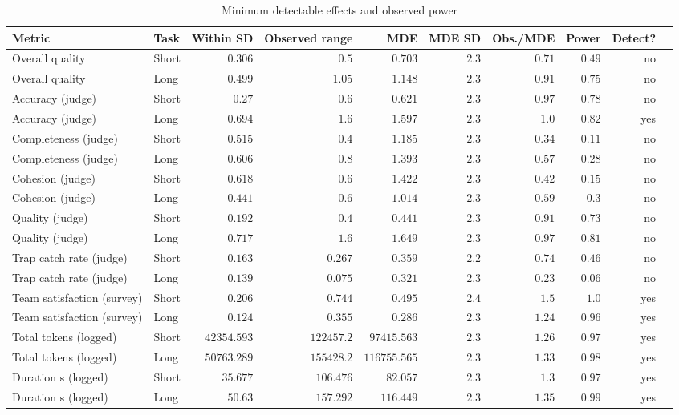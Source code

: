 \begin{table}[htbp]
  \centering
  \small
  \setlength{\tabcolsep}{2pt}
  \caption{Minimum detectable effects and observed power}
  \label{tab:03-mde}
\begin{tabular}{>{\raggedright\arraybackslash}p{4cm}lrrrrrrrc}
    \toprule
    Metric & Task & Within SD & Observed range & MDE & MDE SD & Obs./MDE & Power & Detect? \\
    \midrule
    Overall quality & Short & $0.306$ & $0.5$ & $0.703$ & $2.3$ & $0.71$ & $0.49$ & no \\
    Overall quality & Long & $0.499$ & $1.05$ & $1.148$ & $2.3$ & $0.91$ & $0.75$ & no \\
    Accuracy (judge) & Short & $0.27$ & $0.6$ & $0.621$ & $2.3$ & $0.97$ & $0.78$ & no \\
    Accuracy (judge) & Long & $0.694$ & $1.6$ & $1.597$ & $2.3$ & $1.0$ & $0.82$ & yes \\
    Completeness (judge) & Short & $0.515$ & $0.4$ & $1.185$ & $2.3$ & $0.34$ & $0.11$ & no \\
    Completeness (judge) & Long & $0.606$ & $0.8$ & $1.393$ & $2.3$ & $0.57$ & $0.28$ & no \\
    Cohesion (judge) & Short & $0.618$ & $0.6$ & $1.422$ & $2.3$ & $0.42$ & $0.15$ & no \\
    Cohesion (judge) & Long & $0.441$ & $0.6$ & $1.014$ & $2.3$ & $0.59$ & $0.3$ & no \\
    Quality (judge) & Short & $0.192$ & $0.4$ & $0.441$ & $2.3$ & $0.91$ & $0.73$ & no \\
    Quality (judge) & Long & $0.717$ & $1.6$ & $1.649$ & $2.3$ & $0.97$ & $0.81$ & no \\
    Trap catch rate (judge) & Short & $0.163$ & $0.267$ & $0.359$ & $2.2$ & $0.74$ & $0.46$ & no \\
    Trap catch rate (judge) & Long & $0.139$ & $0.075$ & $0.321$ & $2.3$ & $0.23$ & $0.06$ & no \\
    Team satisfaction (survey) & Short & $0.206$ & $0.744$ & $0.495$ & $2.4$ & $1.5$ & $1.0$ & yes \\
    Team satisfaction (survey) & Long & $0.124$ & $0.355$ & $0.286$ & $2.3$ & $1.24$ & $0.96$ & yes \\
    Total tokens (logged) & Short & $42354.593$ & $122457.2$ & $97415.563$ & $2.3$ & $1.26$ & $0.97$ & yes \\
    Total tokens (logged) & Long & $50763.289$ & $155428.2$ & $116755.565$ & $2.3$ & $1.33$ & $0.98$ & yes \\
    Duration s (logged) & Short & $35.677$ & $106.476$ & $82.057$ & $2.3$ & $1.3$ & $0.97$ & yes \\
    Duration s (logged) & Long & $50.63$ & $157.292$ & $116.449$ & $2.3$ & $1.35$ & $0.99$ & yes \\
    \bottomrule
\end{tabular}%
\end{table}

